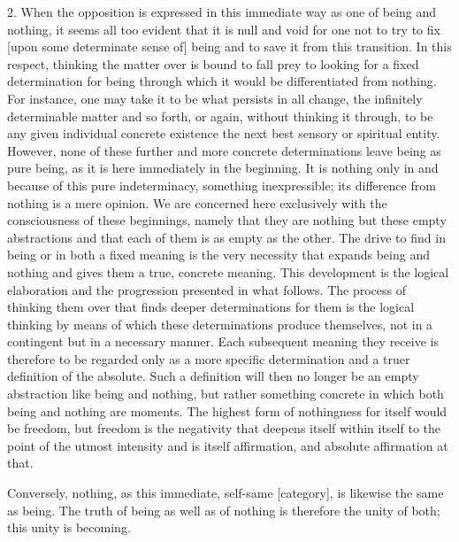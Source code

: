     2. When the opposition is expressed in this immediate way
    as one of being and nothing, it seems all too evident
    that it is null and void for one not to try to fix
    [upon some determinate sense of] being and
    to save it from this transition.
    In this respect, thinking the matter over is bound
    to fall prey to looking for a fixed determination for being
    through which it would be differentiated from nothing.
    For instance, one may take it to be what persists in all change,
    the infinitely determinable matter and so forth,
    or again, without thinking it through, to be
    any given individual concrete existence
    the next best sensory or spiritual entity.
    However, none of these further and more concrete determinations
    leave being as pure being, as it is here immediately in the beginning.
    It is nothing only in and because of this pure indeterminacy,
    something inexpressible;
    its difference from nothing is a mere opinion.
    We are concerned here exclusively with the
    consciousness of these beginnings,
    namely that they are nothing but these empty abstractions and
    that each of them is as empty as the other.
    The drive to find in being or in both a fixed meaning is
    the very necessity that expands being and nothing and
    gives them a true, concrete meaning.
    This development is the logical elaboration and
    the progression presented in what follows.
    The process of thinking them over that finds
    deeper determinations for them is the logical thinking
    by means of which these determinations produce themselves,
    not in a contingent but in a necessary manner.
    Each subsequent meaning they receive is therefore
    to be regarded only as a more specific determination and
    a truer definition of the absolute.
    Such a definition will then no longer be an empty abstraction
    like being and nothing, but rather something concrete in which
    both being and nothing are moments.
    The highest form of nothingness for itself would be freedom,
    but freedom is the negativity that deepens itself within itself
    to the point of the utmost intensity and is itself affirmation,
    and absolute affirmation at that.

Conversely, nothing, as this immediate, self-same [category],
is likewise the same as being.
The truth of being as well as of nothing is
therefore the unity of both;
this unity is becoming.

